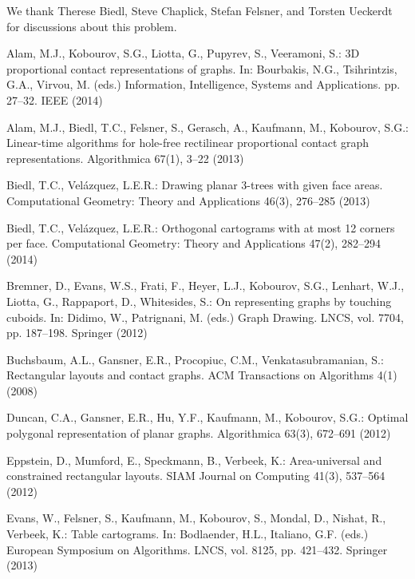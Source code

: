 \documentclass{llncs}
\begin{document}
\medskip
{} We thank 
 Therese Biedl, Steve Chaplick, Stefan Felsner, and Torsten Ueckerdt for discussions about this problem.





{
\begin{small}
\begin{thebibliography}{10}
\providecommand{\url}[1]{\texttt{#1}}
\providecommand{\urlprefix}{URL }

Alam, M.J., Kobourov, S.G., Liotta, G., Pupyrev, S., Veeramoni, S.: {3D}
  proportional contact representations of graphs. In: Bourbakis, N.G.,
  Tsihrintzis, G.A., Virvou, M. (eds.) Information, Intelligence, Systems and
  Applications. pp. 27--32. {IEEE} (2014)

Alam, M.J., Biedl, T.C., Felsner, S., Gerasch, A., Kaufmann, M., Kobourov,
  S.G.: Linear-time algorithms for hole-free rectilinear proportional contact
  graph representations. Algorithmica  67(1),  3--22 (2013)

Biedl, T.C., Vel{\'{a}}zquez, L.E.R.: Drawing planar 3-trees with given face
  areas. Computational Geometry: Theory and Applications  46(3),  276--285
  (2013)

Biedl, T.C., Vel{\'{a}}zquez, L.E.R.: Orthogonal cartograms with at most 12
  corners per face. Computational Geometry: Theory and Applications  47(2),
  282--294 (2014)

Bremner, D., Evans, W.S., Frati, F., Heyer, L.J., Kobourov, S.G., Lenhart,
  W.J., Liotta, G., Rappaport, D., Whitesides, S.: On representing graphs by
  touching cuboids. In: Didimo, W., Patrignani, M. (eds.) Graph Drawing. LNCS,
  vol. 7704, pp. 187--198. Springer (2012)

Buchsbaum, A.L., Gansner, E.R., Procopiuc, C.M., Venkatasubramanian, S.:
  Rectangular layouts and contact graphs. ACM Transactions on Algorithms  4(1)
  (2008)

Duncan, C.A., Gansner, E.R., Hu, Y.F., Kaufmann, M., Kobourov, S.G.: Optimal
  polygonal representation of planar graphs. Algorithmica  63(3),  672--691
  (2012)

Eppstein, D., Mumford, E., Speckmann, B., Verbeek, K.: Area-universal and
  constrained rectangular layouts. SIAM Journal on Computing  41(3),  537--564
  (2012)

Evans, W., Felsner, S., Kaufmann, M., Kobourov, S., Mondal, D., Nishat, R.,
  Verbeek, K.: Table cartograms. In: Bodlaender, H.L., Italiano, G.F. (eds.)
  European Symposium on Algorithms. LNCS, vol. 8125, pp. 421--432. Springer
  (2013)


\end{thebibliography}
\end{small}}
\end{document}
